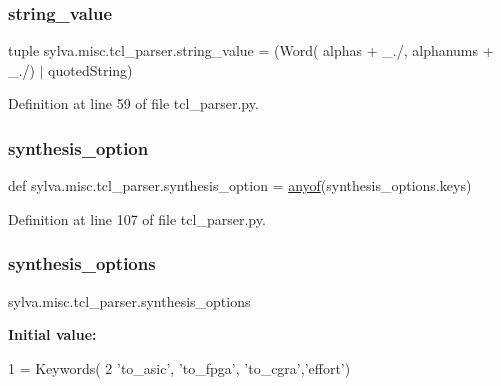 \subsubsection{\texorpdfstring{string\+\_\+value}{string\_value}}
{\footnotesize\ttfamily tuple sylva.\+misc.\+tcl\+\_\+parser.\+string\+\_\+value = (Word( alphas + \textquotesingle{}\+\_\+./\textquotesingle{}, alphanums + \textquotesingle{}\+\_\+./\textquotesingle{}) $\vert$ quoted\+String)}



Definition at line 59 of file tcl\+\_\+parser.\+py.

\mbox{\label{namespacesylva_1_1misc_1_1tcl__parser_ad0697a68890de131865fe7aa8519784e}} 
\subsubsection{\texorpdfstring{synthesis\+\_\+option}{synthesis\_option}}
{\footnotesize\ttfamily def sylva.\+misc.\+tcl\+\_\+parser.\+synthesis\+\_\+option = \hyperlink{namespacesylva_1_1misc_1_1tcl__parser_abc9d84dd4132e13b642242dfac628084}{anyof}(synthesis\+\_\+options.\+keys)}



Definition at line 107 of file tcl\+\_\+parser.\+py.

\mbox{\label{namespacesylva_1_1misc_1_1tcl__parser_a733683e83c5d1482a9f247fd092c1e74}} 
\subsubsection{\texorpdfstring{synthesis\+\_\+options}{synthesis\_options}}
{\footnotesize\ttfamily sylva.\+misc.\+tcl\+\_\+parser.\+synthesis\+\_\+options}

{\bfseries Initial value\+:}
\begin{DoxyCode}
1 =  Keywords(
2     \textcolor{stringliteral}{'to\_asic'}, \textcolor{stringliteral}{'to\_fpga'}, \textcolor{stringliteral}{'to\_cgra'},\textcolor{stringliteral}{'effort'})
\end{DoxyCode}


